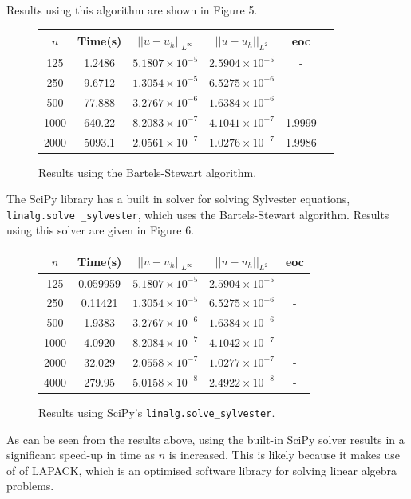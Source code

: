 \documentclass{article}
\numberwithin{equation}{section}
\begin{document}
Results using this algorithm are shown in Figure 5.

\begin{figure}[H]
\centering
\begin{tabular}{|c|c|c|c|c|c|}
\hline
$n$ & Time(s) & $|| u - u_h ||_{L^{\infty}}$ &$|| u - u_h ||_{L^{2}}$ & eoc \\
\hline
125 & 1.2486 & $5.1807 \times 10^{-5}$ & $2.5904 \times 10^{-5}$ & - \\
250 & 9.6712 & $1.3054 \times 10^{-5}$ & $6.5275 \times 10^{-6}$ & - \\
500 & 77.888 & $3.2767 \times 10^{-6}$ & $1.6384 \times 10^{-6}$ & - \\ 
1000 & 640.22 & $8.2083 \times 10^{-7}$ & $4.1041 \times 10^{-7}$ & 1.9999 \\
2000 & 5093.1 & $2.0561 \times 10^{-7}$ & $1.0276 \times 10^{-7}$ & 1.9986 \\
\hline
\end{tabular}
\caption{Results using the Bartels-Stewart algorithm.}
\end{figure}

The SciPy library has a built in solver for solving Sylvester equations, \texttt{linalg.solve \_sylvester}, which uses the Bartels-Stewart algorithm. Results using this solver are given in Figure 6.

\begin{figure}[H]
\centering
\begin{tabular}{|c|c|c|c|c|}
\hline
$n$ & Time(s) & $|| u - u_h ||_{L^{\infty}}$ &$|| u - u_h ||_{L^{2}}$ & eoc \\
\hline
125 & 0.059959 & $5.1807 \times 10^{-5}$ & $2.5904 \times 10^{-5}$ & - \\
250 & 0.11421 & $1.3054 \times 10^{-5}$ & $6.5275 \times 10^{-6}$ & - \\
500 & 1.9383 & $3.2767 \times 10^{-6}$ & $1.6384 \times 10^{-6}$ & - \\
1000 & 4.0920 & $8.2084 \times 10^{-7}$ & $4.1042 \times 10^{-7}$ & - \\
2000 & 32.029 & $2.0558 \times 10^{-7}$ & $1.0277 \times 10^{-7}$ & -  \\
4000 & 279.95 & $5.0158 \times 10^{-8}$ & $2.4922 \times 10^{-8}$ & - \\
\hline
\end{tabular}
\caption{Results using SciPy's \texttt{linalg.solve\_sylvester}.}
\end{figure}

As can be seen from the results above, using the built-in SciPy solver results in a significant speed-up in time as $n$ is increased. This is likely because it makes use of of LAPACK, which is an optimised software library for solving linear algebra problems.
\end{document}

